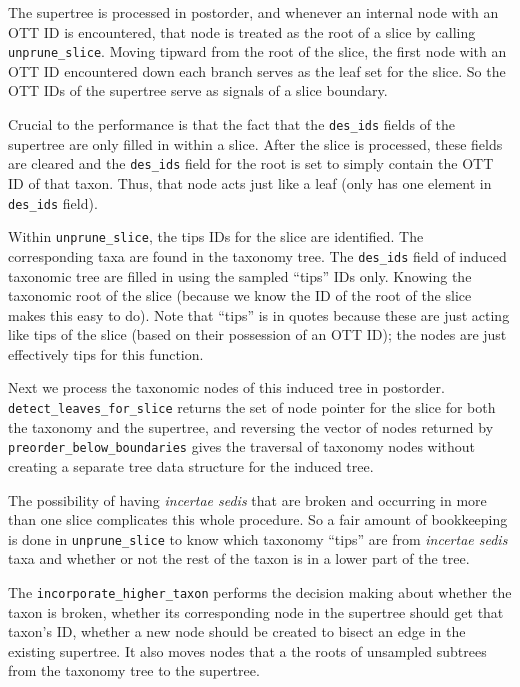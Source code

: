 \documentclass[english]{article}
\newcommand{\incsed}[0]{{\em incertae sedis}\xspace}
\begin{document}
The supertree is processed in postorder, and whenever an internal node with an OTT ID is
    encountered, that node is treated as the root of a slice by calling \texttt{unprune\_slice}.
Moving tipward from the root of the slice, the first node with an OTT ID encountered down
    each branch serves as the leaf set for the slice.
So the OTT IDs of the supertree serve as signals of a slice boundary.


Crucial to the performance is that the fact that the \texttt{des\_ids} fields of the supertree
    are only filled in within a slice. 
After the slice is processed, these fields are cleared and the \texttt{des\_ids} field
    for the root is set to simply contain the OTT ID of that taxon.
Thus, that node acts just like a leaf (only has one element in \texttt{des\_ids} field).


Within \texttt{unprune\_slice}, the tips IDs for the slice are identified.
The corresponding taxa are found in the taxonomy tree.
The \texttt{des\_ids} field of induced taxonomic tree are filled in using the sampled
    ``tips'' IDs only.
Knowing the taxonomic root of the slice (because we know the ID of the root of the
    slice makes this easy to do).
Note that ``tips'' is in quotes because these are just acting like tips of the slice
    (based on their possession of an OTT ID); the nodes are just effectively tips
    for this function.

Next we process the taxonomic nodes of this induced tree in postorder.
\texttt{detect\_leaves\_for\_slice} returns the set of node pointer for
    the slice for both the taxonomy and the supertree,
    and reversing the vector of nodes returned by 
    \texttt{preorder\_below\_boundaries} gives the traversal of taxonomy 
    nodes without creating a separate tree data structure for the induced tree.

The possibility of having \incsed that are broken and occurring in more than
    one slice complicates this whole procedure.
So a fair amount of bookkeeping is done in \texttt{unprune\_slice} to 
    know which taxonomy ``tips'' are from \incsed taxa and whether or 
    not the rest of the taxon is in a lower part of the tree.

The \texttt{incorporate\_higher\_taxon} performs the decision making about whether
    the taxon is broken, whether its corresponding node in the supertree should
    get that taxon's ID, whether a new node should be created to bisect an edge in
    the existing supertree.
It also moves nodes that a the roots of unsampled subtrees from the taxonomy
    tree to the supertree.
\end{document}
